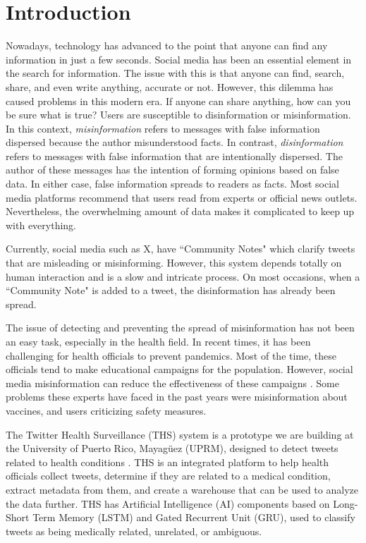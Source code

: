 
\section{Introduction}
\noindent Nowadays, technology has advanced to the point that anyone can find any information in just a few seconds. Social media has been an essential
element in the search for information. The issue with this is that anyone can find, search, share, and even write anything, accurate or not. However, this dilemma
has caused problems in this modern era. If anyone can share anything, how can you be sure what is true? Users are susceptible to disinformation or misinformation.
In this context, {\em misinformation} refers to messages with false information dispersed because the author misunderstood facts. In contrast, {\em disinformation} refers to
messages with false information that are intentionally dispersed. The author of these messages has the intention of forming opinions based on false data. In either
case, false information spreads to readers as facts. Most social media platforms recommend that users read from experts or official news outlets. Nevertheless,
the overwhelming amount of data makes it complicated to keep up with everything.

Currently, social media such as X, %
have ``Community Notes" which clarify tweets that are misleading or misinforming. However, this system
depends totally on human interaction and is a slow and intricate process. On most occasions, when a ``Community Note" is added to a tweet, the disinformation has
already been spread. 

The issue of detecting and preventing the spread of misinformation has not been an easy task, especially in the health field.  In recent times, it has
been challenging for health officials to prevent pandemics. Most of the time, these officials tend to make educational
campaigns for the population. However, social media misinformation can reduce the effectiveness of these campaigns \cite{article}. 
Some problems these experts have faced in the past years were misinformation
about vaccines, and users criticizing  safety measures.

The Twitter Health Surveillance (THS) system is a prototype we are building at the University
of Puerto Rico, Mayag\"uez (UPRM), designed to detect tweets related to health conditions \cite{8622504}. THS is an integrated platform to help health officials collect tweets, determine if they are related to a medical condition, extract
metadata from them, and create a warehouse that can be used to analyze the data further.  THS has Artificial Intelligence (AI) components based on Long-Short Term Memory (LSTM)
and Gated Recurrent Unit (GRU), used to classify tweets as being medically related, unrelated, or ambiguous. 

